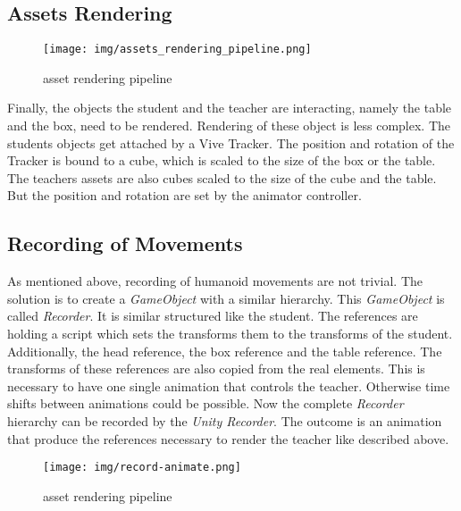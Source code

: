 \subsection{Assets Rendering}
\begin{figure}
	\centering
	\texttt{[image: img/assets\_rendering\_pipeline.png]}
	\caption{asset rendering pipeline}
	\label{fig:asset_rendering_pipeline}
\end{figure}
Finally, the objects the student and the teacher are interacting, namely the table and the box, need to be rendered. Rendering of these object is less complex. The students objects get attached by a Vive Tracker. The position and rotation of the Tracker is bound to a cube, which is scaled to the size of the box or the table. The teachers assets are also cubes scaled to the size of the cube and the table. But the position and rotation are set by the animator controller.
\subsection{Recording of Movements}
As mentioned above, recording of humanoid movements are not trivial. The solution is to create a \textit{GameObject} with a similar hierarchy. This \textit{GameObject} is called \textit{Recorder}. It is similar structured like the student. The references are holding a script which sets the transforms them to the transforms of the student. Additionally, the head reference, the box reference and the table reference. The transforms of these references are also copied from the real elements. This is necessary to have one single animation that controls the teacher. Otherwise time shifts between animations could be possible. Now the complete \textit{Recorder} hierarchy can be recorded by the \textit{Unity Recorder}. The outcome is an animation that produce the references necessary to render the teacher like described above.
\begin{figure}
	\centering
	\texttt{[image: img/record-animate.png]}
	\caption{asset rendering pipeline}
	\label{fig:record_animation}
\end{figure}

